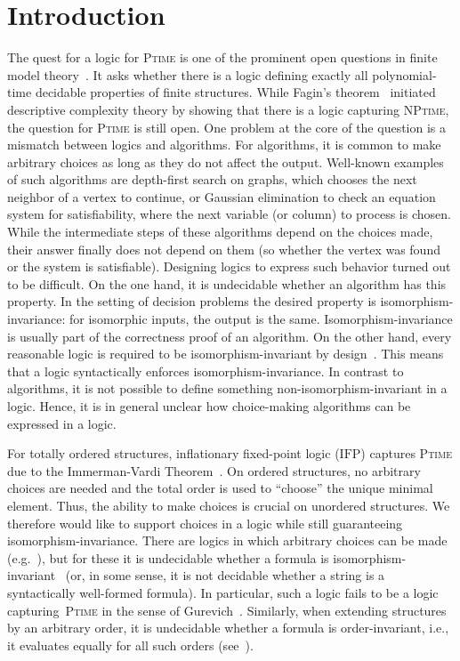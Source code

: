 \documentclass[]{lmcs}
\newcommand{\PTime}{\textsc{Ptime}}
\newcommand{\NPTime}{\textsc{NPtime}}
\newcommand{\IFP}{\ensuremath{\mathrm{IFP}}}
\begin{document}
\section{Introduction}

The quest for a logic for \PTime{} is one of the prominent open questions in finite model theory~\cite{ChandraHarel82, Grohe2008}.
It asks whether there is a logic defining exactly all polynomial-time decidable properties of finite structures.
While Fagin's theorem~\cite{Fagin74} initiated descriptive complexity theory
by showing that there is a logic capturing \NPTime{},
the question for \PTime{}  is still open. 
One problem at the core of the question is a mismatch between logics and algorithms.
For algorithms, it is common to make arbitrary choices as long as they do not affect the output.
Well-known examples of such algorithms are depth-first search on graphs,
which chooses the next neighbor of a vertex to continue, or Gaussian elimination to check an equation system for satisfiability, where the next variable (or column) to process is chosen.
While the intermediate steps of these algorithms depend on the choices made,
their answer finally does not depend on them (so whether the vertex was found or the system is satisfiable).
Designing logics to express such behavior turned out to be difficult.
On the one hand, it is undecidable whether an algorithm has this property.
In the setting of decision problems the desired property is isomorphism-invariance: for isomorphic inputs, the output is the same.
Isomorphism-invariance is usually part of the correctness proof of an algorithm.
On the other hand, every reasonable logic is required to be isomorphism-invariant by design~\cite{ebbinghaus1985, Gurevich1988}.
This means that a logic syntactically enforces isomorphism-invariance.
In contrast to algorithms, it is not possible to define something non-isomorphism-invariant in a logic.
Hence, it is in general unclear how choice-making algorithms can be expressed in a logic.

For totally ordered structures, inflationary fixed-point logic (\IFP{}) captures \PTime{} due to the Immerman-Vardi Theorem~\cite{Immerman87}. 
On ordered structures, no arbitrary choices are needed and the total order is used to ``choose'' the unique minimal element.
Thus, the ability to make choices is crucial on unordered structures.
We therefore would like to support choices in a logic while still guaranteeing isomorphism-invariance.
There are logics in which arbitrary choices can be made (e.g.~\cite{ArvindBiswas87, DawarRicherby03Nondet}),
but for these it is undecidable whether a formula is isomorphism-invariant~\cite{ArvindBiswas87} (or, in some sense, it is not decidable whether a string is a syntactically well-formed formula).
In particular, such a logic fails to be a logic capturing~\PTime{} in the sense of Gurevich~\cite{Gurevich1988}.
Similarly, when extending structures by an arbitrary order,
it is undecidable whether a formula is order-invariant, i.e., it evaluates equally for all such orders (see~\cite{GradelKLMSVVW07}).
\end{document}
